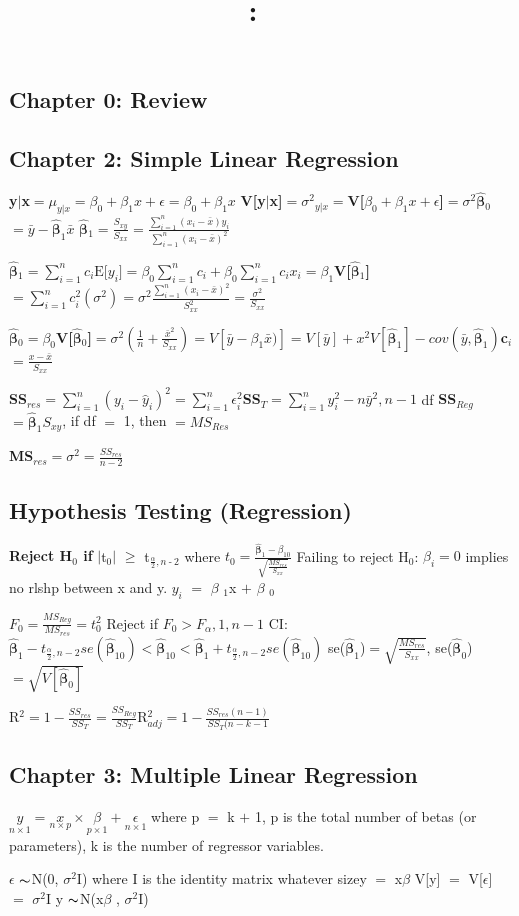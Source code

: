 \documentclass[8pt]{extarticle}
\title{
    \vspace{2in}
    \textmd{\textbf{\hmwkClass:\ \hmwkTitle}}\\
    \normalsize\vspace{0.1in}\small\vspace{0.1in}\large{\textit{\hmwkClassInstructor}}
    \vspace{3in}
}
\author{\hmwkAuthorName}
\date{}
\newcommand{\mt}[1]{\ensuremath{#1}}
\newcommand\ssc[2][\DefaultOpt]{%
  \def\DefaultOpt{#2}%
  \subsection[#1]{#2}%
}
\newcommand{\ep}{\mt{\epsilon} }         %
\newcommand{\afa}{\mt{\alpha} }
\newcommand{\bta}{\mt{\beta} }
\newcommand{\av}[1]{\mt{|}#1\mt{|}}  %
\newcommand{\ps}{\mt{\operatorname{+}} }
\newcommand{\ms}{\mt{\operatorname{-}} }
\newcommand{\gr}{\mt{\operatorname{>}} }
\newcommand{\gre}{\mt{\operatorname{\geq}} }
\newcommand{\eql}{ \mt{\operatorname{=}} }
\newcommand{\uw}[2]{#1\mt{_{#2}}}
\newcommand{\uf}[2]{#1\mt{^{#2}}}
\newcommand{\frc}[2]{\mt{\frac{#1}{#2}}}
\newcommand{\txt}[1]{\text{#1}} %
\newcommand{\tl}{\mt{\thicksim}}
\newcommand{\ssq}{\mt{\sigma^2}}
\newcommand{\bh}[1]{\mathbf{\hat{\text{$#1$}}}}
\newcommand{\bth}{\mt{\bh{\beta}}}
\newcommand{\exv}[1]{\txt{E[}#1\txt{]}}
\newcommand{\vrn}[1]{V[#1]}
\newcommand\tab[1][1cm]{\hspace*{#1}}
\newcommand{\unds}[2]{\mt{\underset{#1}{#2}}} %
\begin{document}
\ssc{Chapter 0: Review}{

}
\ssc{Chapter 2: Simple Linear Regression}{
\textbf{\exv{y$|$x}}$=\mu_{y|x}=$\exv{$\beta_0+\beta_1x+\epsilon$}$=\beta_0+\beta_1x$ \tab \textbf{\vrn{y$|$x}}$=\ssq_{y|x}=$\textbf{\vrn{$\beta_0+\beta_1x+\epsilon$}}$=\ssq$\tab \textbf{\uw{\bth}{0}}$=\bar y - \bth_1\bar x$ \tab \textbf{\uw{\bth}{1}}$=\frac{S_{xy}}{S_{xx}}=\frac{\sum_{i = 1}^n(x_i - \bar x)y_i}{\sum_{i = 1}^n(x_i - \bar x)^2}$

\textbf{\exv{\bth$_1$}}$=\sum_{i = 1}^n c_i\exv{y_i}=\beta_0\sum_{i = 1}^nc_i + \beta_0\sum_{i = 1}^nc_ix_i=\beta_1$\tab \textbf{\vrn{\bth$_1$}}$=\sum_{i = 1}^nc_i^2(\ssq)=\ssq \frac{\sum_{i = 1}^n(x_i - \bar x)^2}{S_{xx}^2}=\frac{\ssq}{S_{xx}}$

\textbf{\exv{\bth$_0$}}$=\beta_0$\tab \textbf{\vrn{\bth$_0$}}$=\ssq(\frac{1}{n} + \frac{\bar x^2}{S_{xx}})=\vrn{\bar y - \beta_1\bar x)}=\vrn{\bar y} + x^2 \vrn{\bth_1} - cov(\bar y, \bth_1)$\tab \textbf{\uw{c}{i}}$=\frac{x - \bar x}{S_{xx}}$

\textbf{SS$_{res}$}$=\sum_{i = 1}^n(y_i - \hat y_i)^2=\sum_{i = 1}^n \epsilon_i^2$\tab \textbf{SS$_T$}$=\sum_{i = 1}^n y_i^2 - n{\bar y}^2, n-1$ df \tab \textbf{SS$_{Reg}$}$=\bth_1S_{xy}$, if df\eql1, then $=MS_{Res}$

\textbf{MS$_{res}$}$=\ssq=\frac{SS_{res}}{n - 2}$

\ssc{Hypothesis Testing (Regression)}{

\textbf{Reject \uw{H}{0} if} \av{\uw{t}{0}} \gre \uw{t}{\frc{\afa}{2}, n \ms 2} where $t_0 = \frac{\bth_1 - \bta_{10}}{\sqrt{\frac{MS_{res}}{S_{xx}}}}$ \tab Failing to reject \uw{H}{0}: $\bta_i = 0$ implies no rlshp between x and y. \tab \exv{$y_i$} \eql \uw{\bta}{1}x \ps \uw{\bta}{0}

$F_0 = \frac{MS_{Reg}}{MS_{res}} = t_0^2$ \tab Reject if $F_0 \gr F_\alpha, 1, n-1$ \tab CI: $\bth_1 - t_{\frac{\alpha}{2}, n - 2}se(\bth_{10}) < \bth_{10} < \bth_1 + t_{\frac{\alpha}{2}, n - 2}se(\bth_{10})$ \tab se($\bth_1$)$=\sqrt{\frac{MS_{res}}{S_{xx}}}$, se($\bth_0$)$=\sqrt{\vrn{\bth_0}}$

\uf{R}{2}$=1 - \frac{SS_{res}}{SS_T} = \frac{SS_{Reg}}{SS_T}$\tab R$^2_{adj} = 1 - \frac{SS_{res}(n - 1)}{SS_T(n - k - 1}$
}
}
\ssc{Chapter 3: Multiple Linear Regression}{

\mt{\unds{n\times1}{y} = \unds{n\times p}{x}\times\unds{p\times1}{\bta} + \unds{n\times1}{\epsilon}}
where p \eql k \ps 1, p is the total number of betas (or parameters), k is the number of regressor variables.

\ep \tl N(0, \ssq I) where I is the identity matrix whatever size\tab \exv{y} \eql x\bta \tab \vrn{y} \eql \vrn{$\epsilon$} \eql \ssq I \tab y \tl N(x\bta, \ssq I)

}
\end{document}

